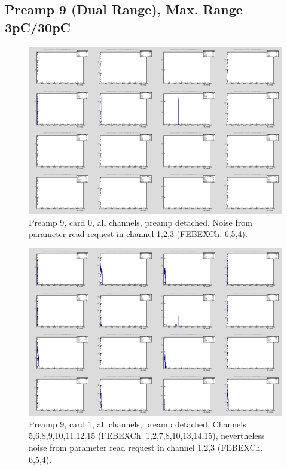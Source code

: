 \documentclass{report}
\begin{document}
\newpage
\clearpage

\subsection{Preamp 9 (Dual Range), Max. Range 3pC/30pC}
\begin{figure}[!htb]
  \includegraphics[width=\linewidth]{rc_bus_test/preamp9_card0_gamma_all.png}
  \caption{Preamp 9, card 0, all channels, preamp detached. Noise from parameter read request in channel 1,2,3 (FEBEXCh. 6,5,4).}
\end{figure}
\begin{figure}[!htb]
  \includegraphics[width=\linewidth]{rc_bus_test/preamp9_card1_gamma_all.png}
  \caption{Preamp 9, card 1, all channels, preamp detached. Channels 5,6,8,9,10,11,12,15 (FEBEXCh. 1,2,7,8,10,13,14,15), nevertheless noise from parameter read request in channel 1,2,3 (FEBEXCh. 6,5,4).}
\end{figure}
\end{document}
